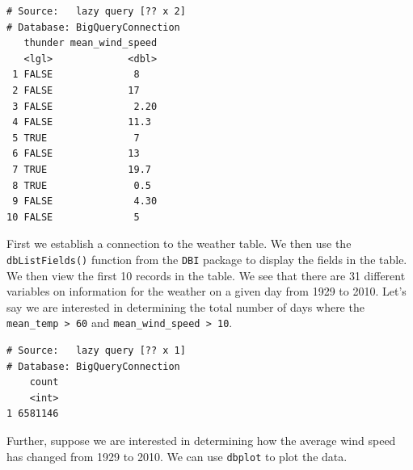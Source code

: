 \documentclass[]{krantz}
\makeatletter
\newenvironment{Shaded}{\begin{snugshade}}{\end{snugshade}}
\newcommand{\KeywordTok}[1]{\textcolor[rgb]{0.27,0.27,0.27}{\textbf{#1}}}
\newcommand{\DataTypeTok}[1]{\textcolor[rgb]{0.27,0.27,0.27}{#1}}
\newcommand{\DecValTok}[1]{\textcolor[rgb]{0.06,0.06,0.06}{#1}}
\newcommand{\StringTok}[1]{\textcolor[rgb]{0.5,0.5,0.5}{#1}}
\newcommand{\OtherTok}[1]{\textcolor[rgb]{0.37,0.37,0.37}{#1}}
\newcommand{\OperatorTok}[1]{\textcolor[rgb]{0.43,0.43,0.43}{\textbf{#1}}}
\newcommand{\NormalTok}[1]{#1}
\newenvironment{kframe}{%
\medskip{}
\setlength{\fboxsep}{.8em}
 \def\at@end@of@kframe{}%
 \ifinner\ifhmode%
  \def\at@end@of@kframe{\end{minipage}}%
  \begin{minipage}{\columnwidth}%
 \fi\fi%
 \def\FrameCommand##1{\hskip\@totalleftmargin \hskip-\fboxsep
 \colorbox{shadecolor}{##1}\hskip-\fboxsep
     \hskip-\linewidth \hskip-\@totalleftmargin \hskip\columnwidth}%
 \MakeFramed {\advance\hsize-\width
   \@totalleftmargin\z@ \linewidth\hsize
   \@setminipage}}%
 {\par\unskip\endMakeFramed%
 \at@end@of@kframe}
\renewenvironment{Shaded}{\begin{kframe}}{\end{kframe}}
\makeatother
\begin{document}
\begin{verbatim}
# Source:   lazy query [?? x 2]
# Database: BigQueryConnection
   thunder mean_wind_speed
   <lgl>             <dbl>
 1 FALSE              8   
 2 FALSE             17   
 3 FALSE              2.20
 4 FALSE             11.3 
 5 TRUE               7   
 6 FALSE             13   
 7 TRUE              19.7 
 8 TRUE               0.5 
 9 FALSE              4.30
10 FALSE              5   
\end{verbatim}

First we establish a connection to the weather table. We then use the
\texttt{dbListFields()} function from the \texttt{DBI} package to
display the fields in the table. We then view the first 10 records in
the table. We see that there are 31 different variables on information
for the weather on a given day from 1929 to 2010. Let's say we are
interested in determining the total number of days where the
\texttt{mean\_temp\ \textgreater{}\ 60} and
\texttt{mean\_wind\_speed\ \textgreater{}\ 10}.

\begin{Shaded}
\end{Shaded}

\begin{verbatim}
# Source:   lazy query [?? x 1]
# Database: BigQueryConnection
    count
    <int>
1 6581146
\end{verbatim}

Further, suppose we are interested in determining how the average wind
speed has changed from 1929 to 2010. We can use \texttt{dbplot} to plot
the data.

\begin{Shaded}
\end{Shaded}
\end{document}
